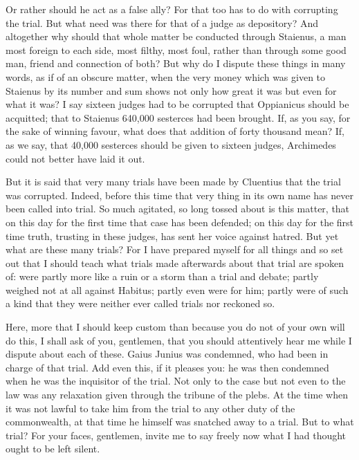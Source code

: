  Or rather should he act as a false ally? For that too has to do with corrupting the trial. But what need was there for that of a judge as depository? And altogether why should that whole matter be conducted through Staienus, a man most foreign to each side, most filthy, most foul, rather than through some good man, friend and connection of both? But why do I dispute these things in many words, as if of an obscure matter, when the very money which was given to Staienus by its number and sum shows not only how great it was but even for what it was? I say sixteen judges had to be corrupted that Oppianicus should be acquitted; that to Staienus 640,000 sesterces had been brought. If, as you say, for the sake of winning favour, what does that addition of forty thousand mean? If, as we say, that 40,000 sesterces should be given to sixteen judges, Archimedes could not better have laid it out.

 But it is said that very many trials have been made by Cluentius that the trial was corrupted. Indeed, before this time that very thing in its own name has never been called into trial. So much agitated, so long tossed about is this matter, that on this day for the first time that case has been defended; on this day for the first time truth, trusting in these judges, has sent her voice against hatred. But yet what are these many trials? For I have prepared myself for all things and so set out that I should teach what trials made afterwards about that trial are spoken of: were partly more like a ruin or a storm than a trial and debate; partly weighed not at all against Habitus; partly even were for him; partly were of such a kind that they were neither ever called trials nor reckoned so.

 Here, more that I should keep custom than because you do not of your own will do this, I shall ask of you, gentlemen, that you should attentively hear me while I dispute about each of these. Gaius Junius was condemned, who had been in charge of that trial. Add even this, if it pleases you: he was then condemned when he was the inquisitor of the trial. Not only to the case but not even to the law was any relaxation given through the tribune of the plebs. At the time when it was not lawful to take him from the trial to any other duty of the commonwealth, at that time he himself was snatched away to a trial. But to what trial? For your faces, gentlemen, invite me to say freely now what I had thought ought to be left silent.


